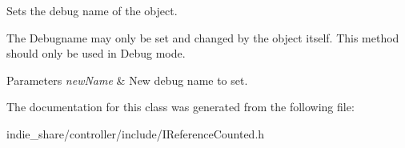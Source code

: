Sets the debug name of the object. 

The Debugname may only be set and changed by the object itself. This method should only be used in Debug mode. 
\begin{DoxyParams}{Parameters}
{\em new\+Name} & New debug name to set. \\
\hline
\end{DoxyParams}


The documentation for this class was generated from the following file\+:\begin{DoxyCompactItemize}
\item 
indie\+\_\+share/controller/include/I\+Reference\+Counted.\+h\end{DoxyCompactItemize}
